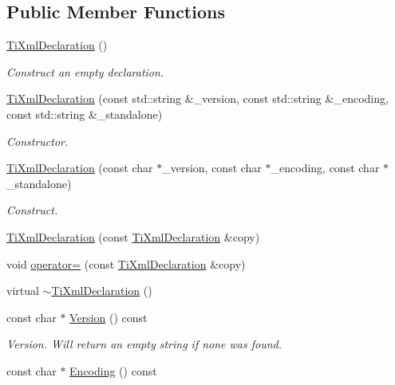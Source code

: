 \subsection*{Public Member Functions}
\begin{DoxyCompactItemize}
\item 
\hyperlink{class_ti_xml_declaration_aa0484d059bea0ea1acb47c9094382d79}{Ti\+Xml\+Declaration} ()
\begin{DoxyCompactList}\small\item\em Construct an empty declaration. \end{DoxyCompactList}\item 
\hyperlink{class_ti_xml_declaration_acd5556007c3c72209465081de39d9836}{Ti\+Xml\+Declaration} (const std\+::string \&\+\_\+version, const std\+::string \&\+\_\+encoding, const std\+::string \&\+\_\+standalone)
\begin{DoxyCompactList}\small\item\em Constructor. \end{DoxyCompactList}\item 
\hyperlink{class_ti_xml_declaration_a3b618d1c30c25e4b7a71f31a595ee298}{Ti\+Xml\+Declaration} (const char $\ast$\+\_\+version, const char $\ast$\+\_\+encoding, const char $\ast$\+\_\+standalone)
\begin{DoxyCompactList}\small\item\em Construct. \end{DoxyCompactList}\item 
\hyperlink{class_ti_xml_declaration_a58ac9042c342f7845c8491da0bb091e8}{Ti\+Xml\+Declaration} (const \hyperlink{class_ti_xml_declaration}{Ti\+Xml\+Declaration} \&copy)
\item 
void \hyperlink{class_ti_xml_declaration_a0fedc57539af9049be8db2d7d9d9ba33}{operator=} (const \hyperlink{class_ti_xml_declaration}{Ti\+Xml\+Declaration} \&copy)
\item 
virtual \hyperlink{class_ti_xml_declaration_ad5f37a673f4c507fd7e550470f9cec25}{$\sim$\+Ti\+Xml\+Declaration} ()
\item 
const char $\ast$ \hyperlink{class_ti_xml_declaration_a95cdcb9354ea220065bd378ffcacc7bd}{Version} () const
\begin{DoxyCompactList}\small\item\em Version. Will return an empty string if none was found. \end{DoxyCompactList}\item 
const char $\ast$ \hyperlink{class_ti_xml_declaration_a8d3d1b5b226daa8353276d719497be80}{Encoding} () const

\end{DoxyCompactItemize}
